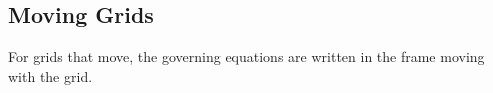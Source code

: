 \subsection{Moving Grids}


For grids that move, the governing equations are written in the frame moving with the
grid. 


